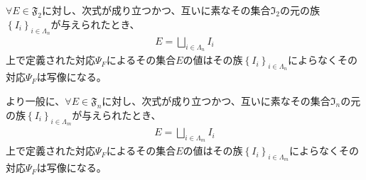 \documentclass[dvipdfmx]{jsarticle}
\begin{document}
\begin{thm}\label{4.5.4.3}
$\forall E \in \mathfrak{F}_{2}$に対し、次式が成り立つかつ、互いに素なその集合$\mathfrak{I}_{2}$の元の族$\left\{ I_{i} \right\}_{i \in \varLambda_{n}}$が与えられたとき、
\begin{align*}
E = \bigsqcup_{i \in \varLambda_{n}} I_{i}
\end{align*}
上で定義された対応$\varPsi_{F}$によるその集合$E$の値はその族$\left\{ I_{i} \right\}_{i \in \varLambda_{n}}$によらなくその対応$\varPsi_{F}$は写像になる。\par
より一般に、$\forall E \in \mathfrak{F}_{n}$に対し、次式が成り立つかつ、互いに素なその集合$\mathfrak{I}_{n}$の元の族$\left\{ I_{i} \right\}_{i \in \varLambda_{m}}$が与えられたとき、
\begin{align*}
E = \bigsqcup_{i \in \varLambda_{m}} I_{i}
\end{align*}
上で定義された対応$\varPsi_{F}$によるその集合$E$の値はその族$\left\{ I_{i} \right\}_{i \in \varLambda_{m}}$によらなくその対応$\varPsi_{F}$は写像になる。
\end{thm}
\end{document}
